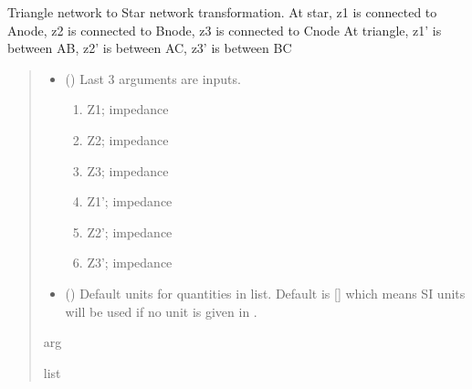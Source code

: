 \documentclass[letterpaper,10pt,english]{sphinxmanual}
\begin{document}

\begin{fulllineitems}
\label{\detokenize{components:components.Triangle2StarTransformation}}
\pysigstartsignatures
{}
\pysigstopsignatures
\sphinxAtStartPar
Triangle network to Star network transformation.
At star, z1 is connected to A\sphinxhyphen{}node, z2 is connected to B\sphinxhyphen{}node, z3 is connected to C\sphinxhyphen{}node
At triangle, z1’ is between A\sphinxhyphen{}B, z2’ is between A\sphinxhyphen{}C, z3’ is between B\sphinxhyphen{}C
\begin{quote}\begin{description}
\begin{itemize}
\item {} 
\sphinxAtStartPar
{} () \textendash{} 
\sphinxAtStartPar
Last 3 arguments are inputs.
\begin{enumerate}
%
\item {} 
\sphinxAtStartPar
Z1; impedance

\item {} 
\sphinxAtStartPar
Z2; impedance

\item {} 
\sphinxAtStartPar
Z3; impedance

\item {} 
\sphinxAtStartPar
Z1’; impedance

\item {} 
\sphinxAtStartPar
Z2’; impedance

\item {} 
\sphinxAtStartPar
Z3’; impedance

\end{enumerate}


\item {} 
\sphinxAtStartPar
{} (\sphinxstyleliteralemphasis{\sphinxupquote{, }}) \textendash{} Default units for quantities in  list. Default is {[}{]} which means SI units will be used if no unit is given in .

\end{itemize}

\sphinxAtStartPar
arg

\sphinxAtStartPar
list

\end{description}\end{quote}

\end{fulllineitems}
\end{document}
